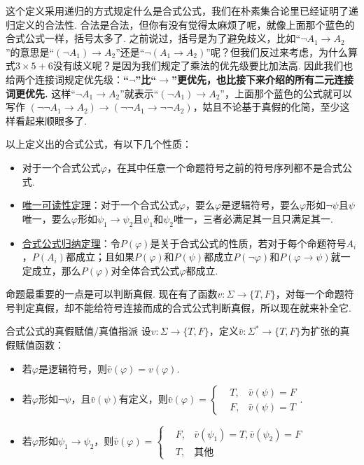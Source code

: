 \documentclass[main.tex]{subfiles}
\begin{document}
这个定义采用递归的方式规定什么是合式公式，我们在朴素集合论里已经证明了递归定义的合法性. 合法是合法，但你有没有觉得太麻烦了呢，就像上面那个蓝色的合式公式一样，括号太多了. 之前说过，括号是为了避免歧义，比如“\(\neg A_1 \to A_2\)”的意思是“\((\neg A_1) \to A_2\)”还是“\(\neg (A_1 \to A_2)\)”呢？但我们反过来考虑，为什么算式\(3\times 5+6\)没有歧义呢？是因为我们规定了乘法的优先级要比加法高. 因此我们也给两个连接词规定优先级：\textbf{“\(\neg\)”比“\(\to\)”更优先，也比接下来介绍的所有二元连接词更优先.} 这样“\(\neg A_1 \to A_2\)”就表示“\((\neg A_1) \to A_2\)”，上面那个蓝色的公式就可以写作{\color{blue} \((\neg\neg A_1 \to A_2) \to (\neg\neg A_1 \to \neg\neg A_2)\)}，姑且不论基于真假的化简，至少这样看起来顺眼多了.

以上定义出的合式公式，有以下几个性质：
\begin{itemize}
    \item 对于一个合式公式\(\varphi\)，在其中任意一个命题符号之前的符号序列都不是合式公式.
    \item \uline{唯一可读性定理}：对于一个合式公式\(\varphi\)，要么\(\varphi\)是逻辑符号，要么\(\varphi\)形如\(\neg \psi\)且\(\psi\)唯一，要么\(\varphi\)形如\(\psi_1 \to \psi_2\)且\(\psi_1\)和\(\psi_2\)唯一，三者必满足其一且只满足其一.
    \item \uline{合式公式归纳定理}：令\(P(\varphi)\)是关于合式公式的性质，若对于每个命题符号\(A_i\)，\(P(A_i)\)都成立；且如果\(P(\varphi)\)和\(P(\psi)\)都成立\(P(\neg\varphi)\)和\(P(\varphi \to \psi)\)就一定成立，那么\(P(\varphi)\)对全体合式公式\(\varphi\)都成立.
\end{itemize}


命题最重要的一点是可以判断真假. 现在有了函数\(v: \Sigma \to \{T, F\}\)，对每一个命题符号判定真假，却不能给符号连接而成的合式公式判断真假，所以现在就来补全它.

\begin{definition}{合式公式的真假赋值/真值指派}
    设\(v: \Sigma \to \{T,F\}\)，定义\(\bar v:\Sigma^* \to \{T,F\}\)为扩张的真假赋值函数：
    \begin{itemize}
        \item 若\(\varphi\)是逻辑符号，则\(\bar v(\varphi) = v(\varphi)\).
        \item 若\(\varphi\)形如\(\neg \psi\)，且\(\bar v(\psi)\)有定义，则\(\bar v(\varphi) = \left\{\begin{aligned} &T, & \bar v(\psi) = F \\ & F, & \bar v(\psi) = T \end{aligned}\right.\).
        \item 若\(\varphi\)形如\(\psi_1 \to \psi_2\)，则\(\bar v(\varphi) = \left\{\begin{aligned} &F, & \bar v(\psi_1) = T, \bar v(\psi_2) = F \\ & T, & \mbox{其他} \end{aligned}\right.\)
    \end{itemize}
\end{definition}
\end{document}
